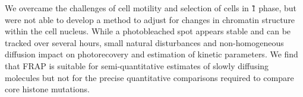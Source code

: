     We overcame the challenges of cell motility
    and selection of cells in \G1{} phase,
    but were not able to develop a method to adjust
    for changes in chromatin structure within the cell nucleus.
    While a photobleached spot appears stable and
    can be tracked over several hours,
    small natural disturbances and non-homogeneous diffusion
    impact on photorecovery
    and estimation of kinetic parameters.
    We find that FRAP is suitable for semi-quantitative
    estimates of slowly diffusing molecules
    but not for the precise quantitative comparisons
    required to compare core histone mutations.


